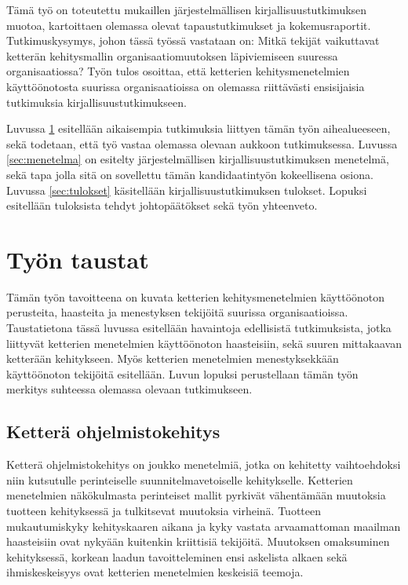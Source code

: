 Tämä työ on toteutettu mukaillen järjestelmällisen kirjallisuustutkimuksen
muotoa, kartoittaen olemassa olevat tapaustutkimukset ja kokemusraportit.
Tutkimuskysymys, johon tässä työssä vastataan on: Mitkä tekijät vaikuttavat
ketterän kehitysmallin organisaatiomuutoksen läpiviemiseen suuressa
organisaatiossa? Työn tulos osoittaa, että ketterien kehitysmenetelmien
käyttöönotosta suurissa organisaatioissa on olemassa riittävästi ensisijaisia
tutkimuksia kirjallisuustutkimukseen.

Luvussa \ref{sec:tausta} esitellään aikaisempia tutkimuksia liittyen tämän työn
aihealueeseen, sekä todetaan, että työ vastaa olemassa olevaan aukkoon
tutkimuksessa. Luvussa \ref{sec:menetelma} on esitelty järjestelmällisen
kirjallisuustutkimuksen menetelmä, sekä tapa jolla sitä on sovellettu tämän
kandidaatintyön kokeellisena osiona. Luvussa \ref{sec:tulokset} käsitellään
kirjallisuustutkimuksen tulokset. Lopuksi esitellään tuloksista tehdyt
johtopäätökset sekä työn yhteenveto.


\clearpage
\section{Työn taustat}
\label{sec:tausta}

Tämän työn tavoitteena on kuvata ketterien kehitysmenetelmien käyttöönoton
perusteita, haasteita ja menestyksen tekijöitä suurissa organisaatioissa.
Taustatietona tässä luvussa esitellään havaintoja edellisistä tutkimuksista,
jotka liittyvät ketterien menetelmien käyttöönoton haasteisiin, sekä suuren
mittakaavan ketterään kehitykseen. Myös ketterien menetelmien menestyksekkään
käyttöönoton tekijöitä esitellään. Luvun lopuksi perustellaan tämän työn
merkitys suhteessa olemassa olevaan tutkimukseen.

\subsection{Ketterä ohjelmistokehitys}

Ketterä ohjelmistokehitys on joukko menetelmiä, jotka on kehitetty vaihtoehdoksi
niin kutsutulle perinteiselle suunnitelmavetoiselle kehitykselle. Ketterien
menetelmien näkökulmasta perinteiset mallit pyrkivät vähentämään muutoksia
tuotteen kehityksessä ja tulkitsevat muutoksia virheinä. Tuotteen
mukautumiskyky kehityskaaren aikana ja kyky vastata arvaamattoman maailman
haasteisiin ovat nykyään kuitenkin kriittisiä tekijöitä. Muutoksen omaksuminen
kehityksessä, korkean laadun tavoitteleminen ensi askelista alkaen sekä
ihmiskeskeisyys ovat ketterien menetelmien keskeisiä teemoja.

